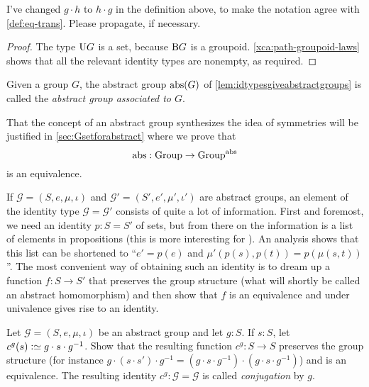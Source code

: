 \begin{remark}
  \color{red} I've changed $g\cdot h$ to $h\cdot g$ in the definition above, to make the notation agree with \cref{def:eq-trans}.
  Please propagate, if necessary.
\end{remark}

\begin{proof}
  The type $\mathrm{U} G$ is a set, because $\mathrm{B} G$ is a groupoid.
  \cref{xca:path-groupoid-laws} shows that all the relevant identity types are nonempty, as required.
\end{proof}

\begin{definition}\label{def:abstrG}
  Given a group $G$, the abstract group $\mathrm{abs}(G)$ of \cref{lem:idtypesgiveabstractgroups} is called the \emph{abstract group associated to $G$}.
\end{definition}


\begin{remark}
  That the concept of an abstract group synthesizes the idea of symmetries will be justified in \cref{sec:Gsetforabstract} where we prove that
$$\mathrm{abs}:\mathrm{Group}\to\mathrm{Group}^{\mathrm{abs}}$$
is an equivalence.
\end{remark}
\begin{remark}
  If $\mathcal G=(S,e,\mu,\iota)$ and $\mathcal G'=(S',e',\mu',\iota')$ are abstract groups, an element of the identity type $\mathcal G=\mathcal G'$ consists of quite a lot of information.  First and foremost, we need an identity $p:S=S'$ of sets, but from there on the information is a list of elements in propositions (this is more interesting for \inftygps).  An analysis shows that this list can be shortened to ``$e'=p(e)$ and $\mu'(p(s),p(t))=p(\mu(s,t))$''.  The most convenient way of obtaining such an identity is to dream up a function $f:S\to S'$ that preserves the group structure (\ie what will shortly be called an abstract homomorphism) and then show that $f$ is an equivalence and  under univalence gives rise to an identity.
\end{remark}
\begin{xca}
  \label{xca:conj}
  Let $\mathcal G=(S,e,\mu,\iota)$ be an abstract group and let $g:S$.  If $s:S$, let $c^g(s)\defequi g\cdot s\cdot g^{-1}$.  Show that the resulting function $c^g:S\to S$ preserves the group structure (for instance $g\cdot(s\cdot s')\cdot g^{-1}=(g\cdot s\cdot g^{-1} )\cdot(g\cdot s\cdot g^{-1})$) and is an equivalence.  The resulting identity $c^g:\mathcal G=\mathcal G$ is called \emph{conjugation} by $g$.
\end{xca}

